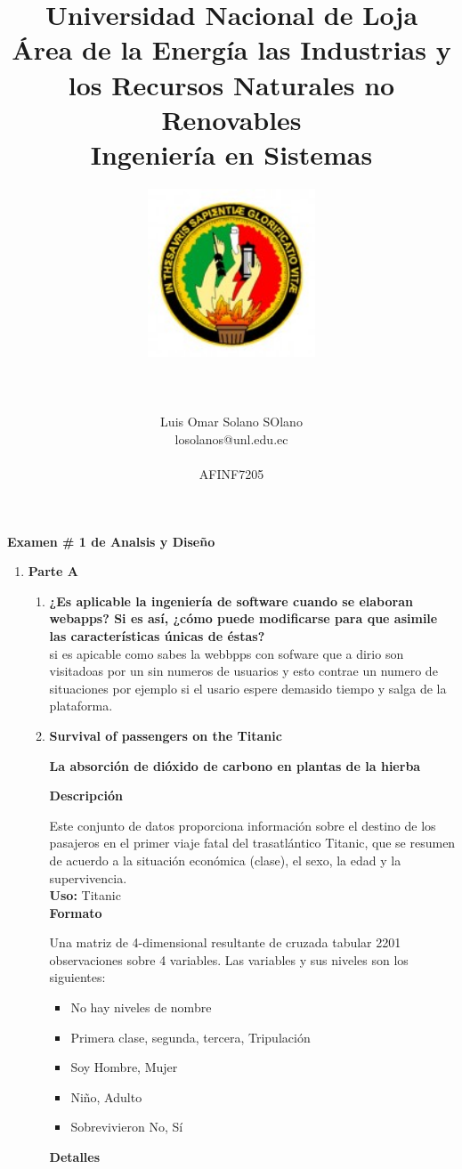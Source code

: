 \documentclass[11pt]{report}
\title{\Huge Universidad Nacional de Loja \\ 
Área de la Energía las Industrias y los Recursos Naturales no Renovables \\
Ingeniería en Sistemas \\}
\author{\includegraphics[width=5cm, height=5cm]{unl.jpg} \\\\\\\\
Luis Omar Solano SOlano \\ losolanos@unl.edu.ec \\\\
AFINF7205}\\\\
\begin{document}

\maketitle
\begin{center}
\textbf{Examen # 1 de Analsis y Diseño }
\end{center}

\begin{enumerate}
\item\textbf{Parte A }\\
\begin{enumerate}
	\begin{enumerate}
		\item\textbf{¿Es aplicable la ingeniería de software cuando se elaboran webapps? Si es así, ¿cómo puede modificarse para que asimile las características únicas de éstas? }\\

si es apicable como sabes la webbpps con sofware que a dirio son visitadoas por un sin numeros de usuarios y esto contrae un numero de situaciones por ejemplo si el usario espere demasido tiempo y salga de la plataforma.

		\item\textbf{Survival of passengers on the Titanic }\\
		
 \begin{center}\textbf{La absorción de dióxido de carbono en plantas de la hierba}\end{center}
\textbf{Descripción}

Este conjunto de datos proporciona información sobre el destino de los pasajeros en el primer viaje fatal del trasatlántico Titanic, que se resumen de acuerdo a la situación económica (clase), el sexo, la edad y la supervivencia.
\\
\textbf{Uso:}
Titanic
\\
\textbf{Formato}

Una matriz de 4-dimensional resultante de cruzada tabular 2201 observaciones sobre 4 variables. Las variables y sus niveles son los siguientes:
\begin{itemize}
\item No hay niveles de nombre
\item Primera clase, segunda, tercera, Tripulación
\item Soy Hombre, Mujer
\item Niño, Adulto
\item Sobrevivieron No, Sí
\end{itemize}
\textbf{Detalles}



\end{enumerate}
\end{enumerate}
\end{enumerate}
\end{document}
